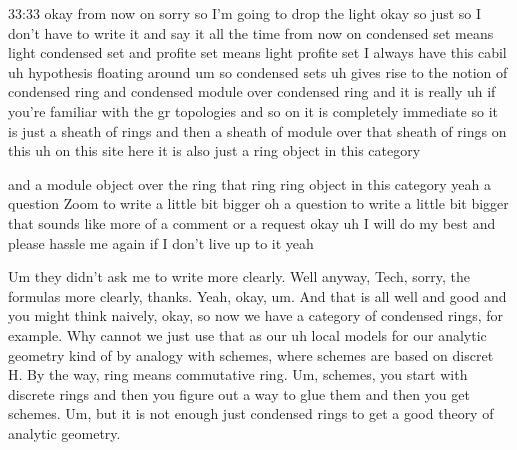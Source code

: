 \begin{unfinished}{33:33}
okay from now on sorry so I'm going to drop the light okay so just so I don't have to write it and say it all the time from now on condensed set means light condensed set and profite set means light profite set I always have this cabil uh hypothesis floating around um so condensed sets uh gives rise to the notion of condensed ring and condensed module over condensed ring and it is really uh if you're familiar with the gr topologies and so on it is completely immediate so it is just a sheath of rings and then a sheath of module over that sheath of rings on this uh on this site here it is also just a ring object in this category

 and a module object over the ring that ring ring object in this category yeah a question Zoom to write a little bit bigger oh a question to write a little bit bigger that sounds like more of a comment or a request okay uh I will do my best and please hassle me again if I don't live up to it yeah

Um they didn't ask me to write more clearly. Well anyway, Tech, sorry, the formulas more clearly, thanks. Yeah, okay, um. And that is all well and good and you might think naively, okay, so now we have a category of condensed rings, for example. Why cannot we just use that as our uh local models for our analytic geometry kind of by analogy with schemes, where schemes are based on discret H. By the way, ring means commutative ring. Um, schemes, you start with discrete rings and then you figure out a way to glue them and then you get schemes. Um, but it is not enough just condensed rings to get a good theory of analytic geometry.


\end{unfinished}

